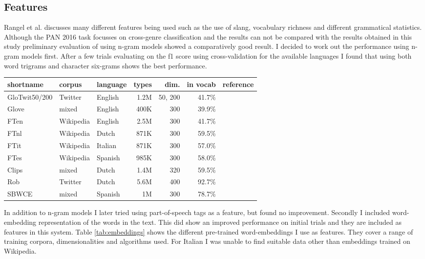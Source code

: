 \documentclass[11pt]{article}
\begin{document}
\subsection{Features}

Rangel et al.  discusses many different features being used such as the use of slang, vocabulary richness and different grammatical statistics.
Although the PAN 2016 task focusses on cross-genre classification and the results can not be compared with the results obtained in this study preliminary evaluation of using n-gram models showed a comparatively good result. I decided to work out the performance using n-gram models first. After a few trials evaluating on the f1 score using cross-validation for the available languages I found that using both word trigrams and character six-grams shows the best performance.

\begin{table*}[ht]
  \centering
  \caption{word-embeddings used as features}
  \label{tab:embeddings}
  \begin{tabular}{ l l l r r r l }
shortname & corpus &language & types & dim. & in vocab & reference \\
\hline
GloTwit50/200 & Twitter & English & 1.2M & 50, 200 & 41.7\% & ~\cite{pennington2014glove}\\
Glove & mixed & English & 400K & 300 & 39.9\% & ~\cite{pennington2014glove}\\
FTen  & Wikipedia & English & 2.5M & 300 & 41.7\% & ~\cite{bojanowski2016enriching}\\
FTnl  & Wikipedia & Dutch & 871K & 300 & 59.5\% & ~\cite{bojanowski2016enriching}\\
FTit  & Wikipedia & Italian & 871K & 300 & 57.0\% & ~\cite{bojanowski2016enriching}\\
FTes  & Wikipedia & Spanish & 985K & 300 & 58.0\% & ~\cite{bojanowski2016enriching}\\
Clips & mixed & Dutch & 1.4M & 320 & 59.5\% & ~\cite{tulkens2016evaluating}\\
Rob   & Twitter & Dutch & 5.6M & 400 & 92.7\% & ~\cite{rob}\\
SBWCE & mixed & Spanish & 1M & 300 & 78.7\% & ~\cite{cardellinoSBWCE}\\
\end{tabular}
\end{table*}

In addition to n-gram models I later tried using part-of-speech tags as a feature, but found no improvement. Secondly I included word-embedding representation of the words in the text. This did show an improved performance on initial trials and they are included as features in this system. Table \ref{tab:embeddings} shows the different pre-trained word-embeddings I use as features. They cover a range of training corpora, dimensionalities and algorithms used. For Italian I was unable to find suitable data other than embeddings trained on Wikipedia.
\end{document}
